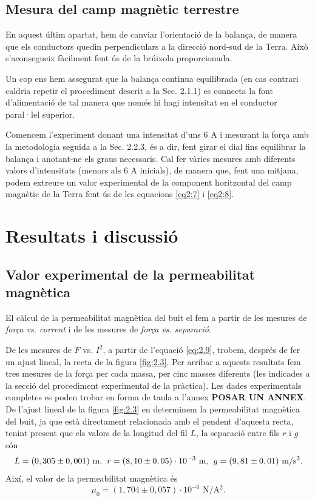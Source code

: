\documentclass[a4paper,10.5pt]{report}
\begin{document}
\subsection{Mesura del camp magnètic terrestre}
En aquest últim apartat, hem de canviar l'orientació de la balança, de manera que els conductors quedin perpendiculars a la direcció nord-sud de la Terra. Això s'aconsegueix fàcilment fent ús de la brúixola proporcionada.

Un cop ens hem assegurat que la balança continua equilibrada (en cas contrari caldria repetir el procediment descrit a la Sec. 2.1.1) es connecta la font d'alimentació de tal manera que només hi hagi intensitat en el conductor paral·lel superior.

Comencem l'experiment donant una intensitat d'uns 6 A i mesurant la força amb la metodologia seguida a la Sec. 2.2.3, és a dir, fent girar el dial fins equilibrar la balança i anotant-ne els graus necessaris. Cal fer vàries mesures amb diferents valors d'intensitats (menors als 6 A inicials), de manera que, fent una mitjana, podem extreure un valor experimental de la component horitzontal del camp magnètic de la Terra fent ús de les equacions \eqref{eq2:7} i \eqref{eq2:8}.

\section{Resultats i discussió}

\subsection{Valor experimental de la permeabilitat magnètica}
El càlcul de la permeabilitat magnètica del buit el fem a partir de les mesures de \textit{força vs. corrent} i de les mesures de \textit{força vs. separació}. 

De les mesures de $F$ vs. $I^2$, a partir de l'equació \eqref{eq:2.9}, trobem, després de fer un ajust lineal, la recta de la figura \ref{fig:2.3}. Per arribar a aquests resultats fem tres mesures de la força per cada massa, per cinc masses diferents (les indicades a la secció del procediment experimental de la pràctica). Les dades experimentals completes es poden trobar en forma de taula a l'annex \textbf{POSAR UN ANNEX}. De l'ajust lineal de la figura \ref{fig:2.3} en determinem la permeabilitat magnètica del buit, ja que està directament relacionada amb el pendent d'aquesta recta, tenint present que els valors de la longitud del fil $L$, la separació entre fils $r$ i $g$ són
\begin{equation}
	L = (0,305\pm 0,001)\text{ m}, \hspace{0.15cm} r = (8,10\pm 0,05)\cdot10^{-3} \text{ m}, \hspace{0.15cm} g = (9,81\pm 0,01) \text{ m/s$^2$}.
\end{equation}
Així, el valor de la permeabilitat magnètica és
\begin{equation}
	\mu_0 = (1,704\pm0,057)\cdot 10^{-6} \text{ N/A$^2$}.
\end{equation}
\end{document}
